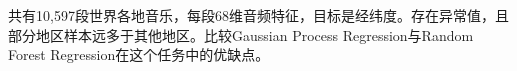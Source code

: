 共有10,597段世界各地音乐，每段68维音频特征，目标是经纬度。存在异常值，且部分地区样本远多于其他地区。比较Gaussian Process Regression与Random Forest Regression在这个任务中的优缺点。
